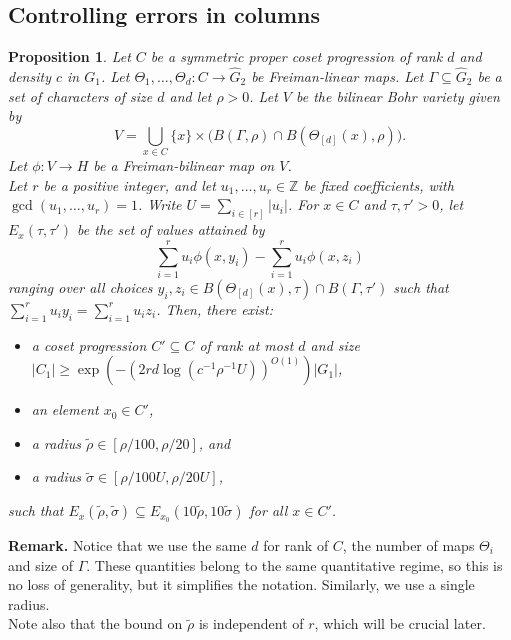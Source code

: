\documentclass[a4paper,11pt]{article}
\numberwithin{theorem}{section}
\newtheorem{proposition}[theorem]{Proposition}
\theoremstyle{definition}
\newcommand{\on}[1]{
	\operatorname{#1}
}
\begin{document}
\subsection{Controlling errors in columns}\label{controllingerrorsubsec}


\begin{proposition}\label{controllingerrorscolsprop}
    Let $C$ be a symmetric proper coset progression of rank $d$ and density $c$ in $G_1$. Let $\Theta_1, \dots, \Theta_d : C \to \hat{G}_2$ be Freiman-linear maps. Let $\Gamma \subseteq \hat{G}_2$ be a set of characters of size $d$ and let $\rho > 0$. Let $V$ be the bilinear Bohr variety given by
    \begin{equation}\label{detaileddomaindefn}V = \bigcup_{x \in C} \{x\} \times \Big(B(\Gamma, \rho) \cap B(\Theta_{[d]}(x), \rho)\Big).\end{equation}
    Let $\phi : V \to H$ be a Freiman-bilinear map on $V$.\\
    \indent Let $r$ be a positive integer, and let $u_1, \dots, u_r \in \mathbb{Z}$ be fixed coefficients, with $\on{gcd}(u_1, \dots, u_r) = 1$. Write $U = \sum_{i \in [r]} |u_i|$. For $x \in C$ and $\tau, \tau' > 0$, let $E_x(\tau, \tau')$ be the set of values attained by
    \[\sum_{i = 1}^r u_i \phi(x, y_i) - \sum_{i = 1}^r u_i \phi(x, z_i)\]
    ranging over all choices $y_i, z_i \in  B(\Theta_{[d]}(x), \tau) \cap B(\Gamma, \tau')$ such that $\sum_{i = 1}^r u_i y_i = \sum_{i = 1}^r u_i z_i$. Then, there exist:
    \begin{itemize}
        \item a coset progression $C' \subseteq C$ of rank at most $d$ and size $|C_1| \geq \exp(-(2rd\log(c^{-1} \rho^{-1} U))^{O(1)}) |G_1|$,
        \item an element $x_0 \in C'$,
        \item a radius $\tilde{\rho} \in [\rho / 100, \rho/20]$, and
        \item a radius $\tilde{\sigma} \in [\rho / 100U, \rho/20U]$, 
    \end{itemize} 
    such that $E_x(\tilde{\rho}, \tilde{\sigma}) \subseteq E_{x_0}(10\tilde{\rho}, 10\tilde{\sigma})$ for all $x \in C'$.
\end{proposition}

\noindent\textbf{Remark.} Notice that we use the same $d$ for rank of $C$, the number of maps $\Theta_i$ and size of $\Gamma$. These quantities belong to the same quantitative regime, so this is no loss of generality, but it simplifies the notation. Similarly, we use a single radius.\\
\indent Note also that the bound on $\tilde{\rho}$ is independent of $r$, which will be crucial later.
\end{document}
